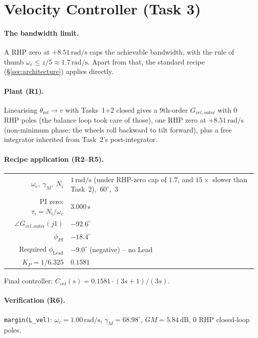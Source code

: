 \section{Velocity Controller (Task 3)}
\label{sec:velocity}

\paragraph{The bandwidth limit.} A RHP zero at $+8.51\,\mathrm{rad/s}$ caps the achievable bandwidth, with the rule of thumb $\omega_c \leq z/5 \approx 1.7\,\mathrm{rad/s}$. Apart from that, the standard recipe (§\ref{sec:architecture}) applies directly.

\paragraph{Plant (R1).} Linearising $\theta_{\mathrm{ref}} \to v$ with Tasks~1+2 closed gives a 9th-order $G_{vel,\mathrm{outer}}$ with $0$ RHP poles (the balance loop took care of those), one RHP zero at $+8.51\,\mathrm{rad/s}$ (non-minimum phase: the wheels roll backward to tilt forward), plus a free integrator inherited from Task~2's post-integrator.

\paragraph{Recipe application (R2--R5).}

\begin{center}\small
\begin{tabular}{rl}
$\omega_c,\ \gamma_M,\ N_i$ & $1\,\mathrm{rad/s}$ (under RHP-zero cap of $1.7$, and $15\times$ slower than Task~2),\ $60^{\circ}$,\ $3$ \\
PI zero: $\tau_i = N_i / \omega_c$ & $3.000\,\mathrm{s}$ \\
$\angle G_{vel,\mathrm{outer}}(j1)$ & $-92.6^{\circ}$ \\
$\phi_{PI}$ & $-18.4^{\circ}$ \\
Required $\phi_{\mathrm{Lead}}$ & $-9.0^{\circ}$ (negative) -- no Lead \\
$K_P = 1 / 6.325$ & $\mathbf{0.1581}$ \\
\end{tabular}
\end{center}

\noindent Final controller: $C_{vel}(s) = 0.1581 \cdot (3s + 1)/(3s)$.

\paragraph{Verification (R6).} \texttt{margin(L\_vel)}: $\omega_c = 1.00\,\mathrm{rad/s}$, $\gamma_M = 68.98^{\circ}$, $GM = 5.84\,\mathrm{dB}$, $0$ RHP closed-loop poles.

